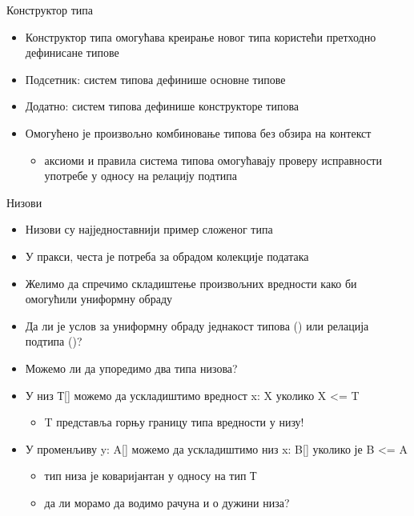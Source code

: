 \documentclass[xcolor=table]{beamer}
\begin{document}
    \begin{frame}{Конструктор типа}
        \begin{itemize}
            \item Конструктор типа омогућава креирање новог типа користећи претходно дефинисане типове
            \item Подсетник: систем типова дефинише основне типове
            \item Додатно: систем типова дефинише конструкторе типова
            \item Омогућено је произвољно комбиновање типова без обзира на контекст
            \begin{itemize}
                \item аксиоми и правила система типова омогућавају проверу исправности употребе у односу на релацију подтипа
            \end{itemize}
        \end{itemize}
    \end{frame}

    \begin{frame}[allowframebreaks]{Низови}
        \begin{itemize}
            \item Низови су најједноставнији пример сложеног типа
            \item У пракси, честа је потреба за обрадом колекције података
            \item Желимо да спречимо складиштење произвољних вредности како би омогућили униформну обраду
            \item Да ли је услов за униформну обраду једнакост типова () или релација подтипа ()?
            \item Можемо ли да упоредимо два типа низова?
        \end{itemize}

        \framebreak

        \begin{itemize}
            \item У низ Т[] можемо да ускладиштимо вредност x: X уколико X <= T
            \begin{itemize}
                \item T представља горњу границу типа вредности у низу!
            \end{itemize}
            \item У променљиву y: A[] можемо да ускладиштимо низ x: B[] уколико је B <= A
            \begin{itemize}
                \item тип низа је коваријантан у односу на тип Т
                \item да ли морамо да водимо рачуна и о дужини низа?
            \end{itemize}
        \end{itemize}
    \end{frame}
\end{document}
